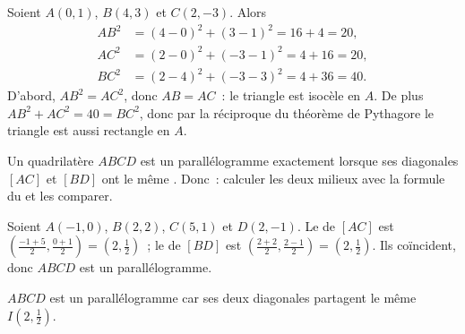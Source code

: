\begin{example}\label{ex:g10:coordgeom:triangle}
Soient $A(0, 1)$, $B(4, 3)$ et $C(2, -3)$. Alors
\begin{align*}
AB^2 &= (4-0)^2 + (3-1)^2 = 16 + 4 = 20, \\
AC^2 &= (2-0)^2 + (-3-1)^2 = 4 + 16 = 20, \\
BC^2 &= (2-4)^2 + (-3-3)^2 = 4 + 36 = 40 .
\end{align*}
D'abord, $AB^2 = AC^2$, donc $AB = AC$~: le triangle est isocèle en $A$.
De plus $AB^2 + AC^2 = 40 = BC^2$, donc par la réciproque du théorème de
Pythagore le triangle est aussi rectangle en $A$.
\end{example}

\begin{method}\label{met:g10:coordgeom:parallelogram}
Un quadrilatère $ABCD$ est un parallélogramme exactement lorsque ses
diagonales $[AC]$ et $[BD]$ ont le même . Donc~: calculer les deux
milieux avec la formule du  et les comparer.
\end{method}

\begin{example}\label{ex:g10:coordgeom:parallelogram}
Soient $A(-1, 0)$, $B(2, 2)$, $C(5, 1)$ et $D(2, -1)$. Le  de
$[AC]$ est $\left(\frac{-1+5}{2}, \frac{0+1}{2}\right) = (2, \frac12)$~;
le  de $[BD]$ est
$\left(\frac{2+2}{2}, \frac{2-1}{2}\right) = (2, \frac12)$. Ils
coïncident, donc $ABCD$ est un parallélogramme.
\end{example}

\begin{omfigure}

{\small $ABCD$ est un parallélogramme car ses deux diagonales partagent
le même  $I(2, \frac12)$.}
\end{omfigure}

